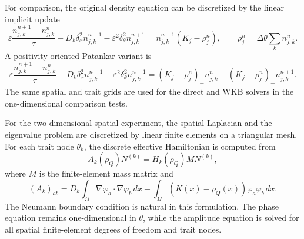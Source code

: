 \documentclass[11pt]{article}
\begin{document}
For comparison, the original density equation can be discretized by the linear
implicit update
\begin{equation}
\label{eq:direct_density_fully}
    \varepsilon
    \frac{n_{j,k}^{n+1}-n_{j,k}^n}{\tau}
    -
    D_k\delta_x^2n_{j,k}^{n+1}
    -
    \varepsilon^2\delta_\theta^2n_{j,k}^{n+1}
    =
    n_{j,k}^{n+1}(K_j-\rho_j^n),
    \qquad
    \rho_j^n=\Delta\theta\sum_k n_{j,k}^n.
\end{equation}
A positivity-oriented Patankar variant is
\begin{equation}
\label{eq:direct_density_patankar}
    \varepsilon
    \frac{n_{j,k}^{n+1}-n_{j,k}^n}{\tau}
    -
    D_k\delta_x^2n_{j,k}^{n+1}
    -
    \varepsilon^2\delta_\theta^2n_{j,k}^{n+1}
    =
    (K_j-\rho_j^n)_+n_{j,k}^n
    -
    (K_j-\rho_j^n)_-n_{j,k}^{n+1}.
\end{equation}
The same spatial and trait grids are used for the direct and WKB solvers in the
one-dimensional comparison tests.

For the two-dimensional spatial experiment, the spatial Laplacian and the
eigenvalue problem are discretized by linear finite elements on a triangular
mesh.  For each trait node \(\theta_k\), the discrete effective Hamiltonian is
computed from
\begin{equation}
\label{eq:fem_H}
    A_k(\rho_Q)N^{(k)}
    =
    H_k(\rho_Q)M N^{(k)},
\end{equation}
where \(M\) is the finite-element mass matrix and
\begin{equation}
\label{eq:fem_A}
    (A_k)_{ab}
    =
    D_k\int_\Omega \nabla\varphi_a\cdot\nabla\varphi_b\,dx
    -
    \int_\Omega (K(x)-\rho_Q(x))\varphi_a\varphi_b\,dx.
\end{equation}
The Neumann boundary condition is natural in this formulation.  The phase
equation remains one-dimensional in \(\theta\), while the amplitude equation is
solved for all spatial finite-element degrees of freedom and trait nodes.







%
%
%
%
%
\end{document}
